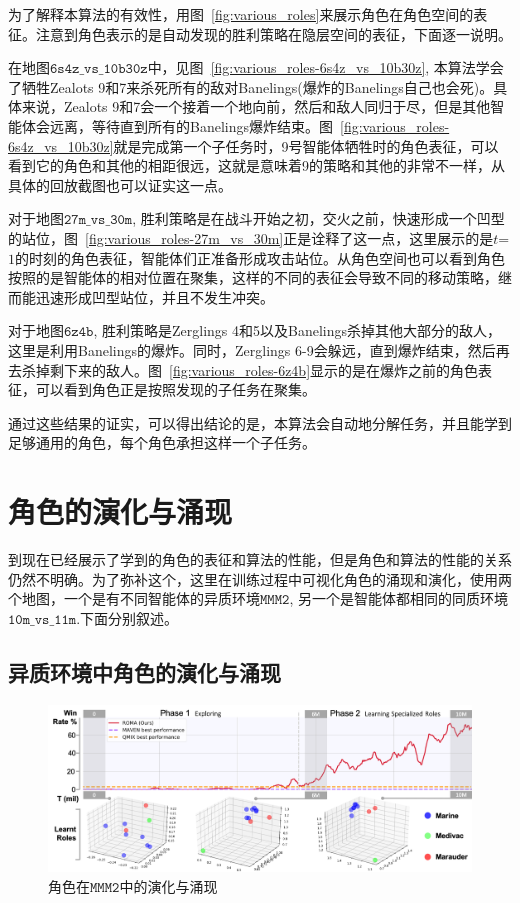为了解释本算法的有效性，用图~\ref{fig:various_roles}来展示角色在角色空间的表征。注意到角色表示的是自动发现的胜利策略在隐层空间的表征，下面逐一说明。

在地图$\mathtt{6s4z\_vs\_10b30z}$中，见图~\ref{fig:various_roles-6s4z_vs_10b30z}, 本算法学会了牺牲Zealots 9和7来杀死所有的敌对Banelings(爆炸的Banelings自己也会死)。具体来说，Zealots 9和7会一个接着一个地向前，然后和敌人同归于尽，但是其他智能体会远离，等待直到所有的Banelings爆炸结束。图~\ref{fig:various_roles-6s4z_vs_10b30z}就是完成第一个子任务时，9号智能体牺牲时的角色表征，可以看到它的角色和其他的相距很远，这就是意味着9的策略和其他的非常不一样，从具体的回放截图也可以证实这一点。

对于地图$\mathtt{27m\_vs\_30m}$, 胜利策略是在战斗开始之初，交火之前，快速形成一个凹型的站位，图~\ref{fig:various_roles-27m_vs_30m}正是诠释了这一点，这里展示的是$t$=$1$的时刻的角色表征，智能体们正准备形成攻击站位。从角色空间也可以看到角色按照的是智能体的相对位置在聚集，这样的不同的表征会导致不同的移动策略，继而能迅速形成凹型站位，并且不发生冲突。

对于地图$\mathtt{6z4b}$, 胜利策略是Zerglings 4和5以及Banelings杀掉其他大部分的敌人，这里是利用Banelings的爆炸。同时，Zerglings 6-9会躲远，直到爆炸结束，然后再去杀掉剩下来的敌人。图~\ref{fig:various_roles-6z4b}显示的是在爆炸之前的角色表征，可以看到角色正是按照发现的子任务在聚集。

通过这些结果的证实，可以得出结论的是，本算法会自动地分解任务，并且能学到足够通用的角色，每个角色承担这样一个子任务。

\section{角色的演化与涌现}\label{sec:role-evolution}
到现在已经展示了学到的角色的表征和算法的性能，但是角色和算法的性能的关系仍然不明确。为了弥补这个，这里在训练过程中可视化角色的涌现和演化，使用两个地图，一个是有不同智能体的异质环境$\mathtt{MMM2}$, 另一个是智能体都相同的同质环境$\mathtt{10m\_vs\_11m}$.下面分别叙述。

\subsection{异质环境中角色的演化与涌现}
\begin{figure}
  \centering
  \includegraphics[width=\linewidth]{figures/evolution/evolution_MMM2.png}
  \caption{角色在$\mathtt{MMM2}$中的演化与涌现}
  \label{fig:role_evolution-heter}
\end{figure}

